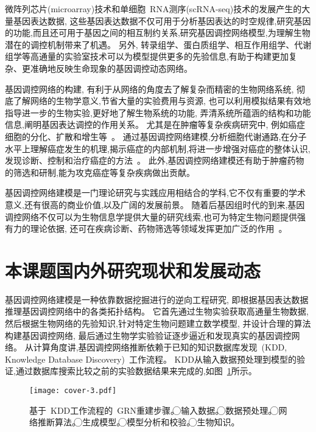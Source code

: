 微阵列芯片(microarray)技术和单细胞~RNA测序(scRNA-seq)技术的发展产生的大量基因表达数据,
这些基因表达数据不仅可用于分析基因表达的时空规律,研究基因的功能,而且还可用于基因之间的相互制约关系,研究基因调控网络模型,为理解生物潜在的调控机制带来了机遇。
另外, 转录组学、蛋白质组学、相互作用组学、代谢组学等高通量的实验室技术可以为模型提供更多的先验信息,有助于构建更加复杂、更准确地反映生命现象的基因调控动态网络。


基因调控网络的构建,
有利于从网络的角度去了解复杂而精密的生物网络系统,
彻底了解网络的生物学意义,节省大量的实验费用与资源,
也可以利用模拟结果有效地指导进一步的生物实验,更好地了解生物系统的功能,
弄清系统所蕴涵的结构和功能信息,阐明基因表达调控的作用关系。
尤其是在肿瘤等复杂疾病研究中,
例如癌症细胞的分化、扩散和增生等~\cite{hurley2011gene}。
通过基因调控网络建模,分析细胞代谢通路,在分子水平上理解癌症发生的机理,揭示癌症的内部机制,将进一步增强对癌症的整体认识,
发现诊断、控制和治疗癌症的方法~\cite{kreeger2009cancer,yan2016biological}。
此外,基因调控网络建模还有助于肿瘤药物的筛选和研制,能为攻克癌症等复杂疾病做出贡献。

基因调控网络建模是一门理论研究与实践应用相结合的学科,它不仅有重要的学术意义,还有很高的商业价值,以及广阔的发展前景。
随着后基因组时代的到来,基因调控网络不仅可以为生物信息学提供大量的研究线索,也可为特定生物问题提供强有力的理论依据,
还可在疾病诊断、药物筛选等领域发挥更加广泛的作用~\cite{kreeger2009cancer}。

\section{本课题国内外研究现状和发展动态}

基因调控网络建模是一种依靠数据挖掘进行的逆向工程研究, 即根据基因表达数据推理基因调控网络中的各类拓扑结构。
它首先通过生物实验获取高通量生物数据, 然后根据生物网络的先验知识,针对特定生物问题建立数学模型, 并设计合理的算法构建基因调控网络,
最后通过生物学实验验证逐步逼近和发现真实的基因调控网络\cite{sima2009inference}。
从计算角度讲,基因调控网络推断依赖于已知的知识数据库发现~(KDD, Knowledge Database Discovery)~工作流程。
KDD从输入数据预处理到模型的验证,通过数据库搜索比较之前的实验数据结果来完成的,如图~\ref{cover-3}所示。
\begin{figure}[!htbp]
    \centering
    \texttt{[image: cover-3.pdf]}
    \caption{基于~KDD工作流程的~GRN重建步骤。
    \textcircled{\raisebox{-0.9pt}{1}}输入数据。
    \textcircled{\raisebox{-0.9pt}{2}}数据预处理。
    \textcircled{\raisebox{-0.9pt}{3}}网络推断算法。
    \textcircled{\raisebox{-0.9pt}{4}}生成模型。
    \textcircled{\raisebox{-0.9pt}{5}}模型分析和校验。
    \textcircled{\raisebox{-0.9pt}{6}}生物知识。
    }
    \label{cover-3}
\end{figure}

